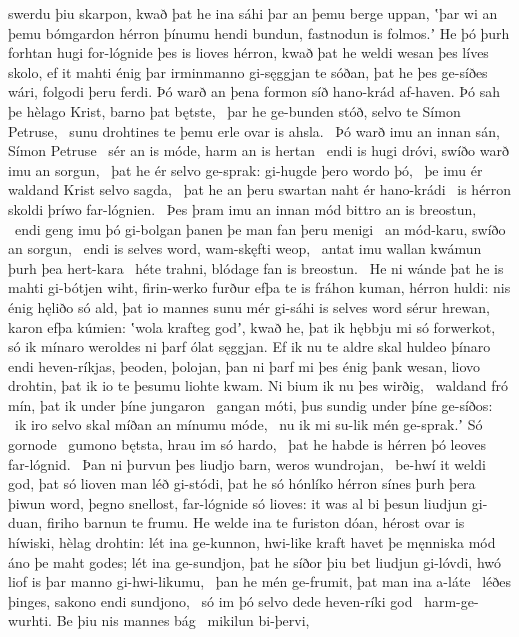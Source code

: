 swerdu þiu skarpon, kwað þat he ina sáhi þar
an þemu berge uppan, ʽþar wi an þemu bómgardon
hérron þínumu hendi bundun,
fastnodun is folmos.ʼ He þó þurh forhtan hugi
for-lógnide þes is lioves hérron, kwað þat he weldi wesan þes líves skolo,
ef it mahti énig þar irminmanno
gi-sęggjan te sóðan, þat he þes ge-síðes wári,
folgodi þeru ferdi. Þó warð an þena formon síð
hano-krád af-haven. Þó sah þe hèlago Krist,
barno þat bętste, \hld\ þar he ge-bunden stóð,
selvo te Símon Petruse, \hld\ sunu drohtines
te þemu erle ovar is ahsla. \hld\ Þó warð imu an innan sán,
Símon Petruse \hld\ sér an is móde,
harm an is hertan \hld\ endi is hugi dróvi,
swíðo warð imu an sorgun, \hld\ þat he ér selvo ge-sprak:
gi-hugde þero wordo þó, \hld\ þe imu ér waldand Krist
selvo sagda, \hld\ þat he an þeru swartan naht
ér hano-krádi \hld\ is hérron skoldi
þríwo far-lógnien. \hld\ Þes þram imu an innan mód
bittro an is breostun, \hld\ endi geng imu þó gi-bolgan þanen
þe man fan þeru menigi \hld\ an mód-karu,
swíðo an sorgun, \hld\ endi is selves word,
wam-skęfti weop, \hld\ antat imu wallan kwámun
þurh þea hert-kara \hld\ héte trahni,
blódage fan is breostun. \hld\ He ni wánde þat he is mahti gi-bótjen wiht,
firin-werko furður efþa te is fráhon kuman,
hérron huldi: nis énig hęliðo só ald,
þat io mannes sunu mér gi-sáhi
is selves word sérur hrewan,
karon efþa kúmien: ʽwola krafteg godʼ, kwað he,
þat ik hębbju mi só forwerkot, só ik mínaro weroldes ni þarf
ólat sęggjan. Ef ik nu te aldre skal
huldeo þínaro endi heven-ríkjas,
þeoden, þolojan, þan ni þarf mi þes énig þank wesan,
liovo drohtin, þat ik io te þesumu liohte kwam.
Ni bium ik nu þes wirðig, \hld\ waldand fró mín,
þat ik under þíne jungaron \hld\ gangan móti,
þus sundig under þíne ge-síðos: \hld\ ik iro selvo skal
míðan an mínumu móde, \hld\ nu ik mi su-lik mén ge-sprak.ʼ
Só gornode \hld\ gumono bętsta,
hrau im só hardo, \hld\ þat he habde is hérren þó
leoves far-lógnid. \hld\ Þan ni þurvun þes liudjo barn,
weros wundrojan, \hld\ be-hwí it weldi god,
þat só lioven man léð gi-stódi,
þat he só hónlíko hérron sínes
þurh þera þiwun word, þegno snellost,
far-lógnide só lioves: it was al bi þesun liudjun gi-duan,
firiho barnun te frumu. He welde ina te furiston dóan,
hérost ovar is híwiski, hèlag drohtin:
lét ina ge-kunnon, hwi-like kraft havet
þe męnniska mód áno þe maht godes;
lét ina ge-sundjon, þat he síðor þiu bet
liudjun gi-lóvdi, hwó liof is þar
manno gi-hwi-likumu, \hld\ þan he mén ge-frumit,
þat man ina a-láte \hld\ léðes þinges,
sakono endi sundjono, \hld\ só im þó selvo dede
heven-ríki god \hld\ harm-ge-wurhti.
Be þiu nis mannes bág \hld\ mikilun bi-þervi,
